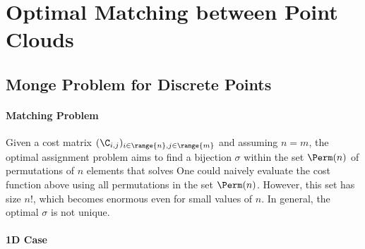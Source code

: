 
\section{Optimal Matching between Point Clouds}

\subsection{Monge Problem for Discrete Points}
\label{sec-monge-pbm}

\paragraph{Matching Problem}

Given a cost matrix $(\C_{i,j})_{i \in \range{n}, j \in \range{m}}$ and assuming $n=m$, the optimal assignment problem aims to find a bijection $\sigma$ within the set $\Perm(n)$ of permutations of $n$ elements that solves
One could naively evaluate the cost function above using all permutations in the set $\Perm(n)$. However, this set has size $n!$, which becomes enormous even for small values of $n$.
%
In general, the optimal $\sigma$ is not unique.


\paragraph{1D Case}

